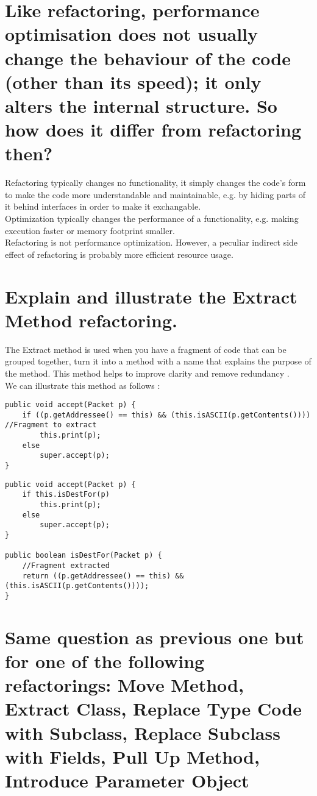 \section{Like refactoring, performance optimisation does not usually change the behaviour of the code
(other than its speed); it only alters the internal structure. So how does it differ from refactoring
then?}

Refactoring typically changes no functionality, it simply changes the code's form to make the code more understandable and maintainable, e.g. by hiding parts of it behind interfaces in order to make it exchangable.
\\
Optimization typically changes the performance of a functionality, e.g. making execution faster or memory footprint smaller.\\
Refactoring is not performance optimization. However, a peculiar indirect side effect of refactoring is probably more efficient resource usage.

\section{Explain and illustrate the Extract Method refactoring.}
 The Extract method is used when you have a fragment of code that can be grouped together, turn it into a method with a name that explains the purpose of the method. This method helps to improve clarity and remove redundancy .
 \\
 We can illustrate this method as follows :\\
 \begin{lstlisting}[caption=Without extract method]
public void accept(Packet p) { 
	if ((p.getAddressee() == this) && (this.isASCII(p.getContents()))) //Fragment to extract
		this.print(p); 
	else  
		super.accept(p); 
}
\end{lstlisting}

\begin{lstlisting}[caption=With extract method]
public void accept(Packet p) {
	if this.isDestFor(p)
    	this.print(p); 
	else
    	super.accept(p); 
}

public boolean isDestFor(Packet p) {
	//Fragment extracted 
	return ((p.getAddressee() == this) && (this.isASCII(p.getContents())));
}
\end{lstlisting}

\section{Same question as previous one but for one of the following refactorings:
Move Method, Extract Class, Replace Type Code with Subclass,
Replace Subclass with Fields, Pull Up Method, Introduce Parameter Object}

